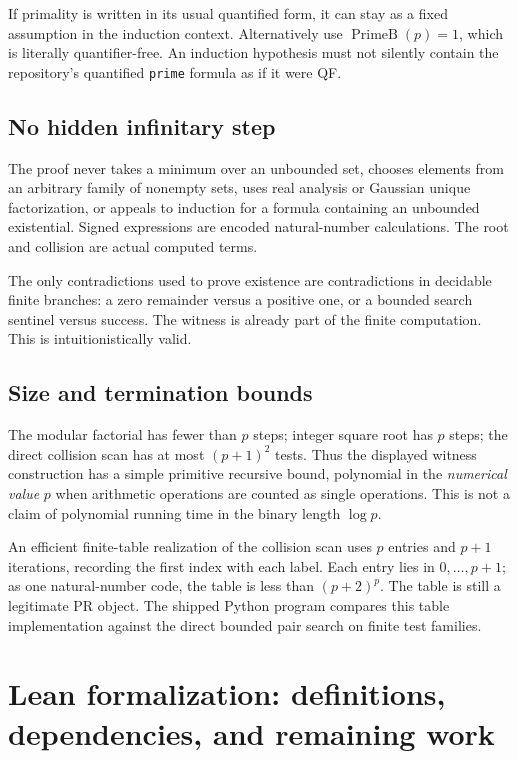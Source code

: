 \documentclass[11pt,letterpaper]{article}
\theoremstyle{definition}
\theoremstyle{remark}
\newcommand{\PrimeB}{\operatorname{PrimeB}}
\begin{document}
If primality is written in its usual quantified form, it can stay as a
fixed assumption in the induction context. Alternatively use
\(\PrimeB(p)=1\), which is literally quantifier-free.
An induction hypothesis must not silently contain the repository's
quantified \texttt{prime} formula as if it were QF.

\subsection{No hidden infinitary step}

The proof never takes a minimum over an unbounded set, chooses elements
from an arbitrary family of nonempty sets, uses real analysis or Gaussian
unique factorization, or appeals to induction for a formula containing an
unbounded existential. Signed expressions are encoded natural-number
calculations. The root and collision are actual computed terms.

The only contradictions used to prove existence are contradictions in
decidable finite branches: a zero remainder versus a positive one, or a
bounded search sentinel versus success. The witness is already part of
the finite computation. This is intuitionistically valid.

\subsection{Size and termination bounds}

The modular factorial has fewer than \(p\) steps; integer square root has
\(p\) steps; the direct collision scan has at most \((p+1)^2\) tests.
Thus the displayed witness construction has a simple primitive recursive
bound, polynomial in the \emph{numerical value} \(p\) when arithmetic
operations are counted as single operations. This is not a claim of
polynomial running time in the binary length \(\log p\).

An efficient finite-table realization of the collision scan uses \(p\)
entries and \(p+1\) iterations, recording the first index with each label.
Each entry lies in \(0,\ldots,p+1\); as one natural-number code, the table
is less than \((p+2)^p\). The table is still a legitimate PR object.
The shipped Python program compares this table implementation against
the direct bounded pair search on finite test families.

\section{Lean formalization: definitions, dependencies, and remaining work}
\label{sec:lean}
\end{document}
